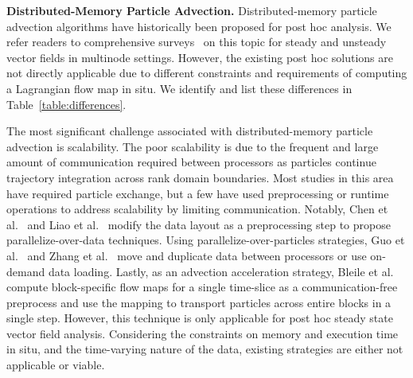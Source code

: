 \textbf{Distributed-Memory Particle Advection.}
%
Distributed-memory particle advection algorithms have historically been proposed for post hoc analysis.
%
We refer readers to comprehensive surveys~\cite{PeterkaRNLSKH11,zhang2018survey} on this topic for steady and unsteady vector fields in multinode settings.
%
However, the existing post hoc solutions are not directly applicable due to different constraints and requirements of computing a Lagrangian flow map in situ.
%
We identify and list these differences in Table~\ref{table:differences}.

The most significant challenge associated with distributed-memory particle advection is scalability.
%
The poor scalability is due to the frequent and large amount of communication required between processors as particles continue trajectory integration across rank domain boundaries.
%
Most studies in this area have required particle exchange, but a few have used preprocessing or runtime operations to address scalability by limiting communication.
%
Notably, Chen et al.~\cite{ChenXLS12, ChenS13} and Liao et al.~\cite{Liao2019ScalablePF} modify the data layout as a preprocessing step to propose parallelize-over-data techniques.
%
%
Using parallelize-over-particles strategies, Guo et al.~\cite{GuoHSZHY14} and Zhang et al.~\cite{ZhangGY16} move and duplicate data between processors or use on-demand data loading.
%
Lastly, as an advection acceleration strategy, Bleile et al.~\cite{bleile2017accelerating} compute block-specific flow maps for a single time-slice as a communication-free preprocess and use the mapping to transport particles across entire blocks in a single step. 
%
However, this technique is only applicable for post hoc steady state vector field analysis.
%
Considering the constraints on memory and execution time in situ, and the time-varying nature of the data, existing strategies are either not applicable or viable. 
%
%


